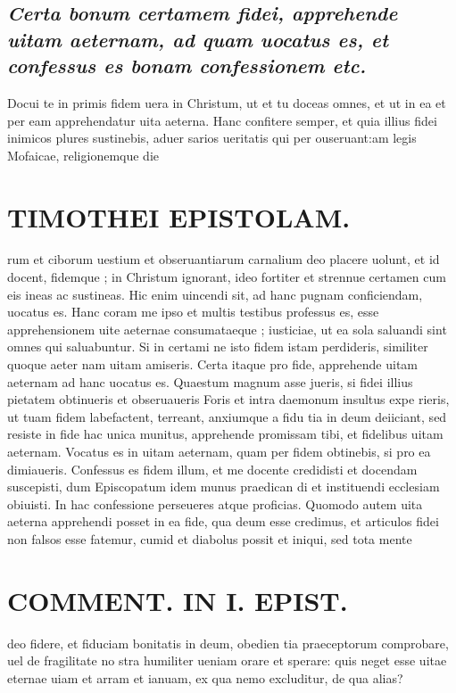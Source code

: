\documentclass{article}
\begin{document}
\begin{pages}
\subsection*{\textit{Certa bonum certamem fidei, apprehende uitam aeternam, ad quam uocatus es, et confessus es bonam confessionem etc. }}\pstart Docui te in primis fidem uera in Christum, ut et tu doceas omnes, et ut in ea et per eam apprehendatur uita aeterna. Hanc confitere semper, et quia illius fidei inimicos plures sustinebis, aduer sarios ueritatis qui per ouseruant:am legis Mofaicae, religionemque die\pend
\section*{TIMOTHEI EPISTOLAM. }
\marginpar{[ p.171 ]}\pstart rum et ciborum uestium et obseruantiarum carnalium deo placere uolunt, et id docent, fidemque ; in Christum ignorant, ideo fortiter et strennue certamen cum eis ineas ac sustineas. Hic enim uincendi sit, ad hanc pugnam conficiendam, uocatus es. Hanc coram me ipso et multis testibus professus es, esse apprehensionem uite aeternae consumataeque ; iusticiae, ut ea sola saluandi sint omnes qui saluabuntur. Si in certami ne isto fidem istam perdideris, similiter quoque aeter nam uitam amiseris. Certa itaque pro fide, apprehende uitam aeternam ad hanc uocatus es. Quaestum magnum asse jueris, si fidei illius pietatem obtinueris et obseruaueris Foris et intra daemonum insultus expe rieris, ut tuam fidem labefactent, terreant, anxiumque a fidu tia in deum deiiciant, sed resiste in fide hac unica munitus, apprehende promissam tibi, et fidelibus uitam aeternam. Vocatus es in uitam aeternam, quam per fidem obtinebis, si pro ea dimiaueris. Confessus es fidem illum, et me docente credidisti et docendam suscepisti, dum Episcopatum idem munus praedican di et instituendi ecclesiam obiuisti. In hac confessione perseueres atque proficias. Quomodo autem uita aeterna apprehendi posset in ea fide, qua deum esse credimus, et articulos fidei non falsos esse fatemur, cumid et diabolus possit et iniqui, sed tota mente  \pend
\section*{COMMENT. IN I. EPIST. }
\marginpar{[ p.172 ]}\pstart deo fidere, et fiduciam bonitatis in deum, obedien tia praeceptorum comprobare, uel de fragilitate no stra humiliter ueniam orare et sperare: quis neget esse uitae eternae uiam et arram et ianuam, ex qua nemo excluditur, de qua alias?  \pend
{}
{}

\end{pages}
\end{document}
